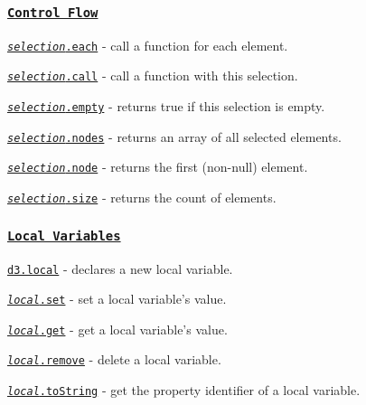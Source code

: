 \subsubsection*{\href{https://github.com/d3/d3-selection/blob/master/README.md#control-flow}{\tt Control Flow}}


\begin{DoxyItemize}
\item \href{https://github.com/d3/d3-selection/blob/master/README.md#selection_each}{\tt {\itshape selection}.each} -\/ call a function for each element.
\item \href{https://github.com/d3/d3-selection/blob/master/README.md#selection_call}{\tt {\itshape selection}.call} -\/ call a function with this selection.
\item \href{https://github.com/d3/d3-selection/blob/master/README.md#selection_empty}{\tt {\itshape selection}.empty} -\/ returns true if this selection is empty.
\item \href{https://github.com/d3/d3-selection/blob/master/README.md#selection_nodes}{\tt {\itshape selection}.nodes} -\/ returns an array of all selected elements.
\item \href{https://github.com/d3/d3-selection/blob/master/README.md#selection_node}{\tt {\itshape selection}.node} -\/ returns the first (non-\/null) element.
\item \href{https://github.com/d3/d3-selection/blob/master/README.md#selection_size}{\tt {\itshape selection}.size} -\/ returns the count of elements.
\end{DoxyItemize}

\subsubsection*{\href{https://github.com/d3/d3-selection/blob/master/README.md#local-variables}{\tt Local Variables}}


\begin{DoxyItemize}
\item \href{https://github.com/d3/d3-selection/blob/master/README.md#local}{\tt d3.\+local} -\/ declares a new local variable.
\item \href{https://github.com/d3/d3-selection/blob/master/README.md#local_set}{\tt {\itshape local}.set} -\/ set a local variable’s value.
\item \href{https://github.com/d3/d3-selection/blob/master/README.md#local_get}{\tt {\itshape local}.get} -\/ get a local variable’s value.
\item \href{https://github.com/d3/d3-selection/blob/master/README.md#local_remove}{\tt {\itshape local}.remove} -\/ delete a local variable.
\item \href{https://github.com/d3/d3-selection/blob/master/README.md#local_toString}{\tt {\itshape local}.to\+String} -\/ get the property identifier of a local variable.
\end{DoxyItemize}

